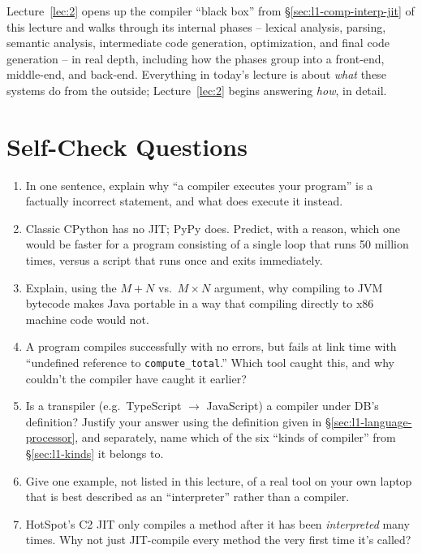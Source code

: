 \documentclass[full-course-notes.tex]{subfiles}
\begin{document}
Lecture~\ref{lec:2} opens up the compiler ``black box'' from \S\ref{sec:l1-comp-interp-jit} of
this lecture and walks through its internal phases -- lexical analysis, parsing, semantic
analysis, intermediate code generation, optimization, and final code generation -- in real
depth, including how the phases group into a front-end, middle-end, and back-end. Everything in
today's lecture is about \emph{what} these systems do from the outside; Lecture~\ref{lec:2}
begins answering \emph{how}, in detail.

\section{Self-Check Questions}
\label{sec:l1-selfcheck}

\begin{enrichment}
\begin{enumerate}
  \item In one sentence, explain why ``a compiler executes your program'' is a factually
  incorrect statement, and what does execute it instead.
  \item Classic CPython has no JIT; PyPy does. Predict, with a reason, which one would be faster
  for a program consisting of a single loop that runs 50 million times, versus a script that
  runs once and exits immediately.
  \item Explain, using the $M+N$ vs.\ $M \times N$ argument, why compiling to JVM bytecode makes
  Java portable in a way that compiling directly to x86 machine code would not.
  \item A program compiles successfully with no errors, but fails at link time with ``undefined
  reference to \texttt{compute\_total}.'' Which tool caught this, and why couldn't the compiler
  have caught it earlier?
  \item Is a transpiler (e.g.\ TypeScript $\to$ JavaScript) a compiler under DB's definition?
  Justify your answer using the definition given in \S\ref{sec:l1-language-processor}, and
  separately, name which of the six ``kinds of compiler'' from \S\ref{sec:l1-kinds} it belongs
  to.
  \item Give one example, not listed in this lecture, of a real tool on your own laptop that is
  best described as an ``interpreter'' rather than a compiler.
  \item HotSpot's C2 JIT only compiles a method after it has been \emph{interpreted} many
  times. Why not just JIT-compile every method the very first time it's called?
\end{enumerate}
\end{enrichment}
\end{document}
